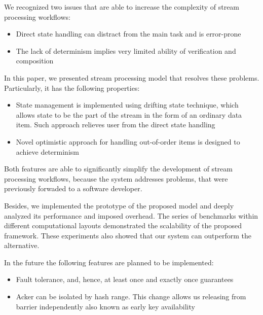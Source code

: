 
\label {fs-conclusions}

We recognized two issues that are able to increase the complexity of stream processing workflows:

\begin{itemize}
    \item Direct state handling can distract from the main task and is error-prone 
    \item The lack of determinism implies very limited ability of verification and composition
\end{itemize}

In this paper, we presented stream processing model that resolves these problems. Particularly, it has the following properties:

\begin{itemize}
    \item State management is implemented using drifting state technique, which allows state to be the part of the stream in the form of an ordinary data item. Such approach relieves user from the direct state handling
    \item Novel optimistic approach for handling out-of-order items is designed to achieve determinism
\end{itemize}

Both features are able to significantly simplify the development of stream processing workflows, because the system addresses problems, that were previously forwaded to a software developer.

Besides, we implemented the prototype of the proposed model and deeply analyzed its performance and imposed overhead. The series of benchmarks within different computational layouts demonstrated the scalability of the proposed framework. These experiments also showed that our system can outperform the alternative.

In the future the following features are planned to be implemented:
\begin{itemize}
    \item Fault tolerance, and, hence, at least once and exactly once guarantees
    \item Acker can be isolated by hash range. This change allows us releasing from barrier independently also known as early key availability
\end{itemize}
